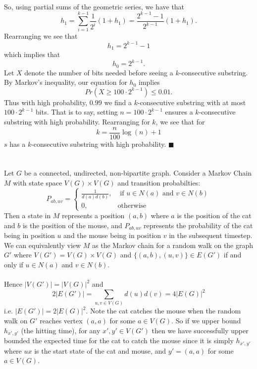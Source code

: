 \documentclass[letterpaper,12pt,oneside,onecolumn]{article}
\begin{document}
\paragraph{}
So, using partial sums of the geometric series, we have that 
$$h_1 = \sum_{i=1}^{k-1} \frac{1}{2^i}(1+h_1) = \frac{2^{k-1}-1}{2^{k-1}}(1+h_1).$$
Rearranging we see that
$$h_1 = 2^{k-1} - 1$$
which implies that
$$h_0 = 2^{k-1}.$$
Let $X$ denote the number of bits needed before seeing a $k$-consecutive substring. By Markov's inequality, our equation for $h_0$ implies
$$Pr(X \geq 100\cdot2^{k-1}) \leq 0.01.$$
Thus with high probability, $0.99$ we find a $k$-consecutive substring with at most $100 \cdot 2^{k-1}$ bits. That is to say, setting $n = 100\cdot 2^{k-1}$ ensures a $k$-consecutive substring with high probability. Rearranging for $k$, we see that for
$$k =\frac{n}{100}\log(n) + 1$$
$s$ has a $k$-consecutive substring with high probability. $\blacksquare$
\newpage
\section{}

\newpage
\section{}
\paragraph{}
Let $G$ be a connected, undirected, non-bipartite graph. Consider a Markov Chain $M$ with state space $V(G) \times V(G)$ and transition probabilties:
$$P_{ab, uv} = \begin{cases}
\frac{1}{d(a)d(b)}, &\text{ if } u \in N(a)\text{ and } v \in N(b) \\
0, &\text{otherwise}
\end{cases}$$
Then a state in $M$ represents a position $(a,b)$ where $a$ is the position of the cat and $b$ is the position of the mouse, and $P_{ab,uv}$ represents the probability of the cat being in position $u$ and the mouse being in position $v$ in the subsequent timestep. We can equivalently view $M$ as the Markov chain for a random walk on the graph $G'$ where $V(G') = V(G) \times V(G)$ and $\{(a,b), (u,v)\} \in E(G')$ if and only if $u \in N(a)$ and $v \in N(b)$.
\paragraph{}
Hence $|V(G')| = |V(G)|^2$ and 
$$2|E(G')| = \sum_{u,v \in V(G)} d(u)d(v) = 4|E(G)|^2$$
i.e. $|E(G')| = 2|E(G)|^2$. Note the cat catches the mouse when the random walk on $G'$ reaches vertex $(a,a)$ for some $a \in V(G)$. So if we upper bound $h_{x',y'}$ (the hitting time), for any $x', y' \in V(G')$ then we have successfully upper bounded the expected time for the cat to catch the mouse since it is simply $h_{x',y'}$ where $ux$ is the start state of the cat and mouse, and $y' = (a,a)$ for some $a \in V(G)$.
\end{document}
